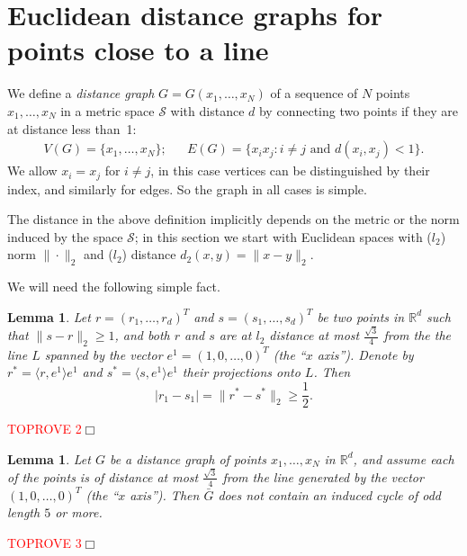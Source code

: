 \documentclass{article}
\newenvironment{proof}{\noindent{\bf Proof}}{\hspace*{\fill}$\Box$}
\newtheorem{lemma} [theorem] {Lemma}\newtheorem{attempt} [theorem] {Attempt}\newtheorem{corollary} [theorem] {Corollary}\newtheorem{prop} [theorem] {Proposition}\newtheorem{definition} [theorem] {Definition}\newtheorem{remark} [theorem] {Remark}\newtheorem{conjecture} [theorem] {Conjecture}\newtheorem{claim} [theorem] {Claim}
\begin{document}
\section {Euclidean distance graphs for points close to a line}
\label{sec.perfect}

We define a \emph{distance graph} $G=G(x_1, \dots, x_N)$
of a sequence of $N$ points $x_1, \dots, x_N$ in a metric space $\mathcal{S}$ with distance $d$ by connecting two points if they are at distance less than~1:
\begin{align*}
    V(G) = \{x_1, \dots, x_N\}; & &  E(G) = \{x_i x_j : i \ne j \mbox { and } d(x_i,x_j) < 1\}.
\end{align*}
We allow $x_i = x_j$ for $i \ne j$, in this case vertices can be distinguished by their index,
and similarly for edges. So the graph in all cases is simple.

The distance in the above definition implicitly depends on the metric or the norm induced by the space $\mathcal S$; in this section we start with Euclidean spaces with ($l_2$) norm $\|\cdot\|_2$ and ($l_2$) distance $d_2(x,y) = \|x-y\|_2$. 

We will need the following simple fact.
\begin{lemma}\label{lem.pyth}
    Let $r=(r_1, \dots, r_d)^T$ and $s=(s_1, \dots, s_d)^T$ be
    two points in $\mathbb{R}^d$ such that $\|s-r\|_2 \ge 1$,
    and both $r$ and $s$ are at $l_2$ distance at most $\frac {\sqrt 3} 4$ from the 
    the line $L$ spanned by the vector $e^1 = (1,0, \dots, 0)^T$ (the ``$x$ axis'').
Denote by $r^*=\langle r, e^1 \rangle e^1$ and $s^*=\langle s,e^1 \rangle e^1$ their projections
    onto $L$. Then
    \begin{equation*} |r_1 - s_1| = \|r^*-s^*\|_2 \ge \frac 1 2.
    \end{equation*}
\end{lemma}

\begin{proof}\textcolor{red}{TOPROVE 2}\end{proof}



\begin{lemma}\label{lem.C5_complement}
    Let $G$ be a distance graph of points $x_1, \dots, x_N$ in $\mathbb{R}^d$,
    and assume each of the points is of distance at most $\frac {\sqrt 3} 4$
    from the line generated by the vector $(1, 0, \dots,0)^T$ (the ``$x$ axis''). 
    Then $\bar{G}$ does not contain
    an induced cycle of odd length $5$ or more.
\end{lemma}
\begin{proof}\textcolor{red}{TOPROVE 3}\end{proof}
\end{document}
